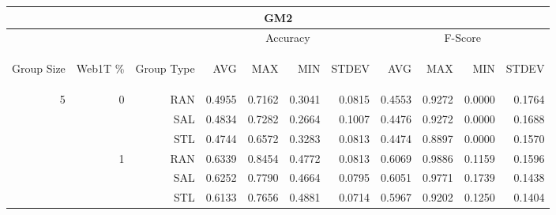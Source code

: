 \begin{center}
\begin{table}[htbp]
\begin{tabular}{ | r | r | r | r | r | r | r | r | r | r | r |}
\hline
\multicolumn{11}{|c|}{GM2}\\
\hline
 & & & \multicolumn{4}{|c|}{Accuracy} & \multicolumn{4}{|c|}{F-Score}\\ \cline{4-11}
\begin{sideways}Group Size\end{sideways} & \begin{sideways}Web1T \%\end{sideways} & \begin{sideways}Group Type\end{sideways} & \begin{sideways}AVG\end{sideways} & \begin{sideways}MAX\end{sideways} & \begin{sideways}MIN\end{sideways} & \begin{sideways}STDEV\end{sideways} & \begin{sideways}AVG\end{sideways} & \begin{sideways}MAX\end{sideways} & \begin{sideways}MIN\end{sideways} & \begin{sideways}STDEV\end{sideways}\\
\hline
\multirow{18}{*}{5}
 & \multirow{3}{*}{0} & RAN & 0.4955 & 0.7162 & 0.3041 & 0.0815 & 0.4553 & 0.9272 & 0.0000 & 0.1764\\ \cline{3-11}
 &   & SAL & 0.4834 & 0.7282 & 0.2664 & 0.1007 & 0.4476 & 0.9272 & 0.0000 & 0.1688\\ \cline{3-11}
 &   & STL & 0.4744 & 0.6572 & 0.3283 & 0.0813 & 0.4474 & 0.8897 & 0.0000 & 0.1570\\ \cline{2-11}
 & \multirow{3}{*}{1} & RAN & 0.6339 & 0.8454 & 0.4772 & 0.0813 & 0.6069 & 0.9886 & 0.1159 & 0.1596\\ \cline{3-11}
 &   & SAL & 0.6252 & 0.7790 & 0.4664 & 0.0795 & 0.6051 & 0.9771 & 0.1739 & 0.1438\\ \cline{3-11}
 &   & STL & 0.6133 & 0.7656 & 0.4881 & 0.0714 & 0.5967 & 0.9202 & 0.1250 & 0.1404\\ \cline{2-11}

\end{tabular}
\end{table}
\end{center}
